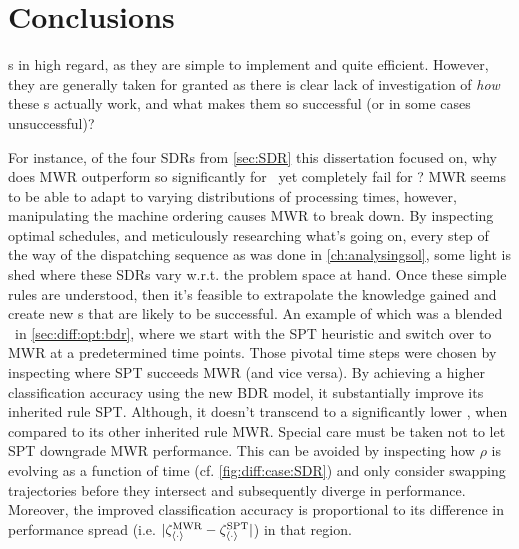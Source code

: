 
\chapter{Conclusions}\label{ch:conclusions} 
 \sdr s in high regard, as they 
are simple to implement and quite efficient. 
However, they are generally taken for granted as there is clear lack of 
investigation of \emph{how} these \dr s actually work, and what 
makes them so successful (or in some cases unsuccessful)? 

For instance, of the four SDRs from \cref{sec:SDR} this dissertation focused 
on, why does MWR outperform so significantly for \jsp\, yet completely fail for 
\fsp? 
MWR seems to be able to adapt to varying distributions of processing times, 
however, manipulating the machine ordering causes MWR to break down. 
By inspecting optimal schedules, and meticulously researching what's going on, 
every step of the way of the dispatching sequence as was done in 
\cref{ch:analysingsol}, some light is shed where these SDRs vary w.r.t. the 
problem space at hand. 
Once these simple rules are understood, then it's feasible to extrapolate the 
knowledge gained and create new \cdr s that are likely to be successful. 
An example of which was a blended \dr\ in \cref{sec:diff:opt:bdr}, where we 
start with the SPT heuristic and switch over to MWR at a predetermined time 
points. Those pivotal time steps were chosen by inspecting where SPT succeeds 
MWR (and vice versa). 
By achieving a higher classification accuracy using the new BDR model, it 
substantially improve its inherited rule SPT.
Although, it doesn't transcend to a significantly lower \namerho, when compared 
to its other inherited rule MWR. 
Special care must be taken not to let SPT downgrade MWR performance. This can 
be avoided by inspecting how $\rho$ is evolving as a function of time (cf. 
\cref{fig:diff:case:SDR}) and only consider swapping trajectories before they 
intersect and subsequently diverge in performance. 
Moreover, the improved classification accuracy is proportional to its 
difference in performance spread (i.e. 
$\lvert\zeta^{\text{MWR}}_{\langle \cdot \rangle} - \zeta^{\text{SPT}}_{\langle \cdot \rangle}\rvert$) in that region.

